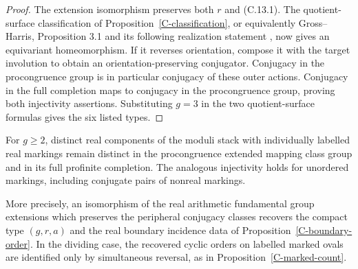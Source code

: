 \begin{proof}
The extension isomorphism preserves both $r$ and (C.13.1).
The quotient-surface classification of
Proposition~\ref{C-classification}, or equivalently Gross--Harris,
Proposition 3.1 and its following realization statement
\cite{GrossHarris1981}, now gives an equivariant homeomorphism.
If it reverses orientation, compose it with the target involution
to obtain an orientation-preserving conjugator. Conjugacy in the
procongruence group is in particular conjugacy of these outer
actions. Conjugacy in the full completion maps to conjugacy in the
procongruence group, proving both injectivity assertions. Substituting
$g=3$ in the two quotient-surface formulas gives the six listed types.
\end{proof}


\begin{theorem}
\label{C-marked-injectivity}
For $g\geq2$, distinct real components of the moduli stack with
individually labelled real markings remain distinct in the
procongruence extended mapping class group and in its full profinite
completion. The analogous injectivity holds for unordered markings,
including conjugate pairs of nonreal markings.

More precisely, an isomorphism of the real arithmetic fundamental
group extensions which preserves the peripheral conjugacy classes
recovers the compact type $(g,r,a)$ and the real boundary incidence
data of Proposition~\ref{C-boundary-order}. In the dividing case,
the recovered cyclic orders on labelled marked ovals are identified
only by simultaneous reversal, as in
Proposition~\ref{C-marked-count}.
\end{theorem}
